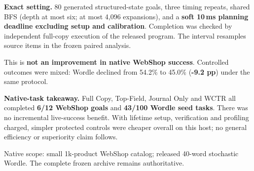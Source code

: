 \documentclass[10pt]{article}
\begin{document}
\par
{\fontsize{10}{13.2}\selectfont
\textbf{\color{Navy}Exact setting.} 80 generated structured-state goals, three timing
repeats, shared BFS (depth at most six; at most 4,096 expansions), and a
\textbf{soft 10\,ms planning deadline excluding setup and calibration}.
Completion was checked by independent full-copy execution of the released
program. The interval resamples source items in the frozen paired analysis.\par}
\vspace{3pt}
This is \textbf{not an improvement in native WebShop success}.
Controlled outcomes were mixed: Wordle declined from 54.2\% to 45.0\%
(\textcolor{Warm}{\textbf{-9.2 pp}}) under the same protocol.

\vspace{5pt}
\colorbox{Pale}{\begin{minipage}{\dimexpr\linewidth-2\fboxsep\relax}
  \textbf{\color{Navy}Native-task takeaway.}
  Full Copy, Top-Field, Journal Only and WCTR all completed
  \textbf{6/12 WebShop goals} and \textbf{43/100 Wordle seed tasks}.
  There was no incremental live-success benefit. With lifetime setup,
  verification and profiling charged, simpler protected controls were cheaper overall on
  this host; no general efficiency or superiority claim follows.\par
  \vspace{3pt}
  {\fontsize{9.6}{12.5}\selectfont\color{Muted}
  Native scope: small 1k-product WebShop catalog; released 40-word stochastic
  Wordle. The complete frozen archive remains authoritative.\par}
\end{minipage}}\par
\end{document}
